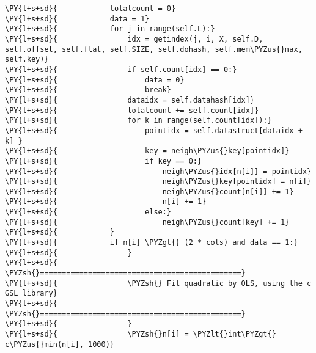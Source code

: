 \begin{Verbatim}[commandchars=\\\{\}]
\PY{l+s+sd}{            totalcount = 0}
\PY{l+s+sd}{            data = 1}
\PY{l+s+sd}{            for j in range(self.L):}
\PY{l+s+sd}{                idx = getindex(j, i, X, self.D, self.offset, self.flat, self.SIZE, self.dohash, self.mem\PYZus{}max, self.key)}
\PY{l+s+sd}{                if self.count[idx] == 0:}
\PY{l+s+sd}{                    data = 0}
\PY{l+s+sd}{                    break}
\PY{l+s+sd}{                dataidx = self.datahash[idx]}
\PY{l+s+sd}{                totalcount += self.count[idx]}
\PY{l+s+sd}{                for k in range(self.count[idx]):}
\PY{l+s+sd}{                    pointidx = self.datastruct[dataidx + k] }
\PY{l+s+sd}{                    key = neigh\PYZus{}key[pointidx]}
\PY{l+s+sd}{                    if key == 0:}
\PY{l+s+sd}{                        neigh\PYZus{}idx[n[i]] = pointidx}
\PY{l+s+sd}{                        neigh\PYZus{}key[pointidx] = n[i]}
\PY{l+s+sd}{                        neigh\PYZus{}count[n[i]] += 1}
\PY{l+s+sd}{                        n[i] += 1}
\PY{l+s+sd}{                    else:}
\PY{l+s+sd}{                        neigh\PYZus{}count[key] += 1}
\PY{l+s+sd}{            }
\PY{l+s+sd}{            if n[i] \PYZgt{} (2 * cols) and data == 1:}
\PY{l+s+sd}{                }
\PY{l+s+sd}{                \PYZsh{}==============================================}
\PY{l+s+sd}{                \PYZsh{} Fit quadratic by OLS, using the c GSL library}
\PY{l+s+sd}{                \PYZsh{}==============================================}
\PY{l+s+sd}{                }
\PY{l+s+sd}{                \PYZsh{}n[i] = \PYZlt{}int\PYZgt{} c\PYZus{}min(n[i], 1000)}


\end{Verbatim}
